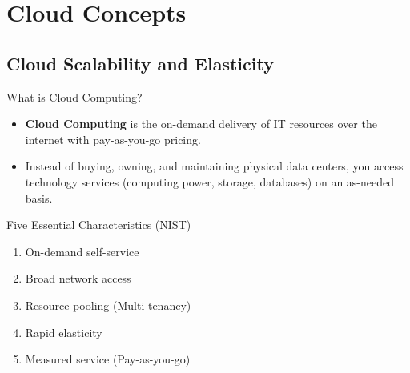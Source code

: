 \documentclass[aspectratio=169]{beamer}  %
\begin{document}
\section{Cloud Concepts}
\subsection{Cloud Scalability and Elasticity}


\begin{frame}[t]{What is Cloud Computing?}
    \begin{itemize}
        \item \textbf{Cloud Computing} is the on-demand delivery of IT resources over the internet with pay-as-you-go pricing.
        \item Instead of buying, owning, and maintaining physical data centers, you access technology services (computing power, storage, databases) on an as-needed basis.
    \end{itemize}
    \vspace{0.4em}
    \begin{block}{Five Essential Characteristics (NIST)}
        \begin{enumerate}
            \footnotesize
            \item On-demand self-service
            \item Broad network access
            \item Resource pooling (Multi-tenancy)
            \item Rapid elasticity
            \item Measured service (Pay-as-you-go)
        \end{enumerate}
    \end{block}
\end{frame}
\end{document}

